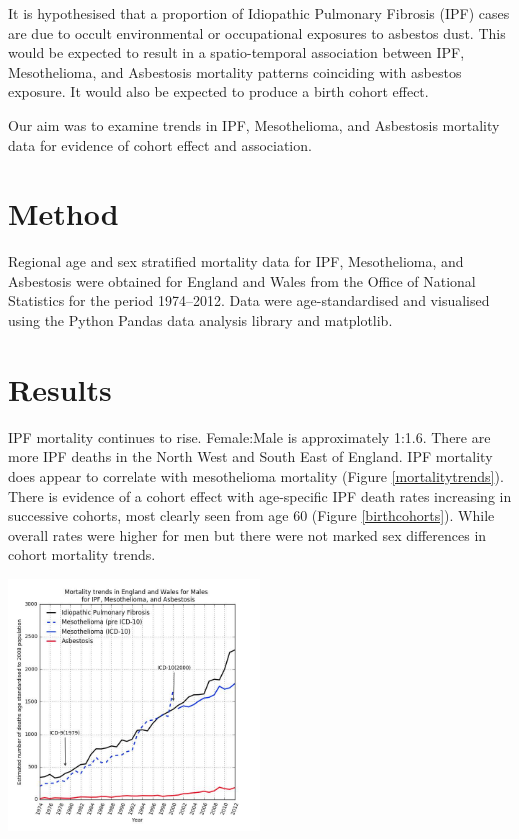 \documentclass[12pt,a4paper,]{report}
\let\origfigure=\figure
\let\endorigfigure=\endfigure
\renewenvironment{figure}[1][]{%
\origfigure[b]
}{%
\endorigfigure
}
\begin{document}
It is hypothesised that a proportion of Idiopathic Pulmonary Fibrosis
(IPF) cases are due to occult environmental or occupational exposures to
asbestos dust. This would be expected to result in a spatio-temporal
association between IPF, Mesothelioma, and Asbestosis mortality patterns
coinciding with asbestos exposure. It would also be expected to produce
a birth cohort effect.

Our aim was to examine trends in IPF, Mesothelioma, and Asbestosis
mortality data for evidence of cohort effect and association.

\hypertarget{method-1}{%
\section{Method}\label{method-1}}

Regional age and sex stratified mortality data for IPF, Mesothelioma,
and Asbestosis were obtained for England and Wales from the Office of
National Statistics for the period 1974--2012. Data were
age-standardised and visualised using the Python Pandas data analysis
library and matplotlib.

\hypertarget{results-1}{%
\section{Results}\label{results-1}}

IPF mortality continues to rise. Female:Male is approximately 1:1.6.
There are more IPF deaths in the North West and South East of England.
IPF mortality does appear to correlate with mesothelioma mortality
(Figure \ref{mortalitytrends}). There is evidence of a cohort effect
with age-specific IPF death rates increasing in successive cohorts, most
clearly seen from age 60 (Figure \ref{birthcohorts}). While overall
rates were higher for men but there were not marked sex differences in
cohort mortality trends.

\begin{figure}
\centering
\includegraphics[width=0.5\textwidth,height=\textheight]{./tex2pdf.-c788ce828caea25c/eeadfd2a881431b65eafbc89d9e56a4112d53a37.jpg}
\caption{IPF, mesothelioma, and asbestosis mortality trends
\label{mortalitytrends}}
\end{figure}
\end{document}
